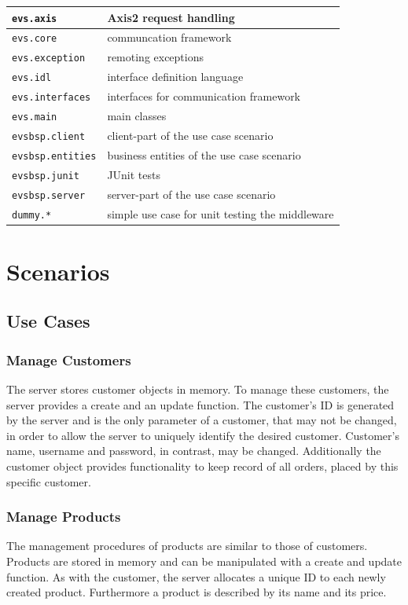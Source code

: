 \documentclass[a4paper]{article}
\begin{document}
	\begin{tabular}{|l|l|}
	\hline
	\texttt{evs.axis} & Axis2 request handling\\
	\hline
	\texttt{evs.core} & communcation framework\\
	\hline
	\texttt{evs.exception} & remoting exceptions\\
	\hline
	\texttt{evs.idl} & interface definition language\\
	\hline
	\texttt{evs.interfaces} & interfaces for communication framework\\
	\hline
	\texttt{evs.main} & main classes\\
	\hline
	\texttt{evsbsp.client} & client-part of the use case scenario\\
	\hline
	\texttt{evsbsp.entities} & business entities of the use case scenario\\
	\hline
	\texttt{evsbsp.junit} & JUnit tests\\
	\hline
	\texttt{evsbsp.server} & server-part of the use case scenario\\
	\hline
	\texttt{dummy.*} & simple use case for unit testing the middleware\\
	\hline
	\end{tabular}

\newpage



\section{Scenarios}

\subsection{Use Cases}

\subsubsection{Manage Customers}
The server stores customer objects in memory. To manage these customers, the server provides a create and an update function. The customer's ID is generated by the server and is the only parameter of a customer, that may not be changed, in order to allow the server to uniquely identify the desired customer. Customer's name, username and password, in contrast, may be changed. Additionally the customer object provides functionality to keep record of all orders, placed by this specific customer.

\subsubsection{Manage Products}
The management procedures of products are similar to those of customers. Products are stored in memory and can be manipulated with a create and update function. As with the customer, the server allocates a unique ID to each newly created product. Furthermore a product is described by its name and its price.
\end{document}
